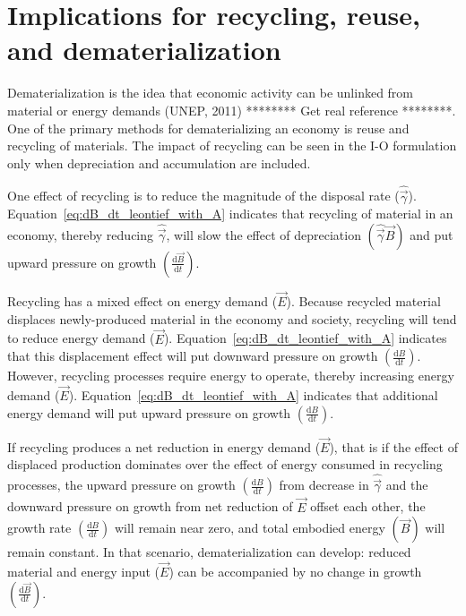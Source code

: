 \section{Implications for recycling, reuse, and dematerialization}

Dematerialization is the idea that economic activity can be unlinked 
from material or energy demands (UNEP, 2011) 
******** Get real reference ********. 
One of the primary methods for dematerializing an economy 
is reuse and recycling of materials. 
The impact of recycling can be seen in the I-O formulation 
only when depreciation and accumulation are included. 

One effect of recycling is to reduce the magnitude 
of the disposal rate 
($\hat{\vec{\gamma}}$). 
Equation~\ref{eq:dB_dt_leontief_with_A} indicates that 
recycling of material in an economy, 
thereby reducing $\hat{\vec{\gamma}}$, 
will slow the effect of depreciation 
$\left(\hat{\vec{\gamma}}\vec{B}\right)$ 
and put upward pressure on growth 
$\left(\frac{\mathrm{d}\vec{B}}{\mathrm{d}t}\right)$. 

Recycling has a mixed effect on energy demand ($\vec{E}$). 
Because recycled material displaces newly-produced material 
in the economy and society, 
recycling will tend to reduce energy demand ($\vec{E}$). 
Equation~\ref{eq:dB_dt_leontief_with_A} indicates that 
this displacement effect will put downward pressure on growth 
$\left(\frac{\mathrm{d}B}{\mathrm{d}t}\right)$. 
However, recycling processes require energy to operate, 
thereby increasing energy demand ($\vec{E}$). 
Equation~\ref{eq:dB_dt_leontief_with_A} indicates that 
additional energy demand will put upward pressure on growth 
$\left(\frac{\mathrm{d}B}{\mathrm{d}t}\right)$. 

If recycling produces a net reduction in energy demand ($\vec{E}$), 
that is if the effect of displaced production dominates over the effect 
of energy consumed in recycling processes, 
the upward pressure on growth $\left(\frac{\mathrm{d}B}{\mathrm{d}t}\right)$ 
from decrease in $\hat{\vec{\gamma}}$ and 
the downward pressure on growth from net reduction of $\vec{E}$ 
offset each other, 
the growth rate $\left(\frac{\mathrm{d}B}{\mathrm{d}t}\right)$ 
will remain near zero, 
and total embodied energy $(\vec{B})$ will remain constant. 
In that scenario, dematerialization can develop: 
reduced material and energy input ($\vec{E}$) can be accompanied by 
no change in growth $\left(\frac{\mathrm{d}\vec{B}}{\mathrm{d}t}\right)$.


